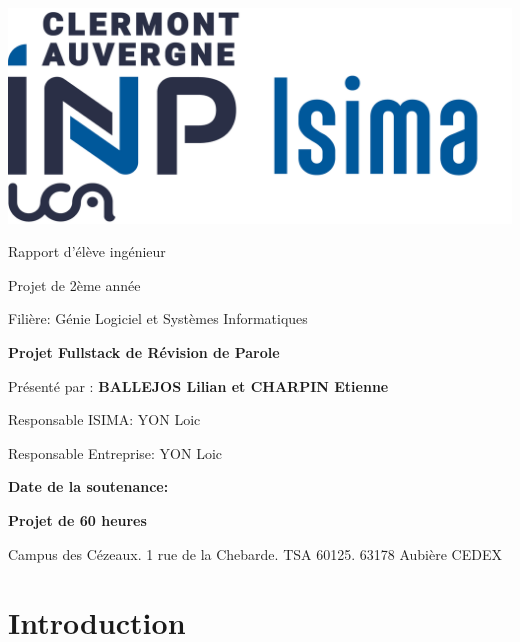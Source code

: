 \documentclass[12pt,french]{article}
\begin{document}
\begin{titlepage} %

  
  \includegraphics[scale=0.35]{isima.png}
  
  \vspace*{3cm} %
  
  \begin{center}
  	\large
  	Rapport d'élève ingénieur
  	
  	Projet de 2ème année
  	
  	Filière: Génie Logiciel et Systèmes Informatiques
  	
  	\huge
  	\textbf{Projet Fullstack de Révision de Parole}
  \end{center}
  
  \vspace*{1.8cm} 
  
  \begin{center}
 
  	
  \Large Présenté par : \textbf{BALLEJOS Lilian et CHARPIN Etienne}
  
   \end{center}

\vspace*{6cm}
  
  
  \vspace*{2cm} 
  
  	\begin{minipage}{.45\linewidth}
  		\begin{flushleft}
  			Responsable ISIMA: YON Loic
  			
  			Responsable Entreprise: YON Loic
  		\end{flushleft}
  	\end{minipage}
  	\hfill
  	\begin{minipage}{.45\linewidth}
  		\begin{flushright}
  			\textbf{Date de la soutenance: }
  			
  			\textbf{Projet de 60 heures}
  		\end{flushright} 
  	\end{minipage}
  	
  	\bigskip
  	
    Campus des Cézeaux. 1 rue de la Chebarde. TSA 60125. 63178 Aubière CEDEX
    	

\end{titlepage}

\restoregeometry


\normalsize\tableofcontents %


\section{Introduction}
\end{document}
